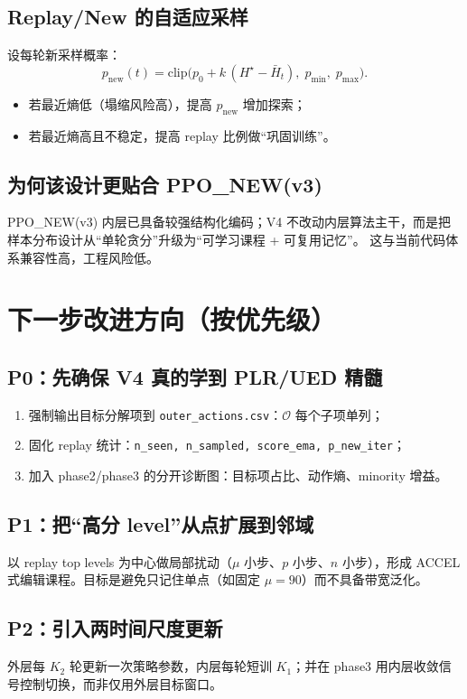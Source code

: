 \documentclass[UTF8,11pt,a4paper]{ctexart}
\begin{document}
\subsection{Replay/New 的自适应采样}
设每轮新采样概率：
\begin{equation}
\label{eq:pnew}
p_{\mathrm{new}}(t)=\mathrm{clip}\Big(p_0+k\,(H^\star-\bar H_t),\;p_{\min},\;p_{\max}\Big).
\end{equation}
\begin{itemize}
\item 若最近熵低（塌缩风险高），提高 $p_{\mathrm{new}}$ 增加探索；
\item 若最近熵高且不稳定，提高 replay 比例做“巩固训练”。
\end{itemize}

\subsection{为何该设计更贴合 PPO\_NEW(v3)}
PPO\_NEW(v3) 内层已具备较强结构化编码；V4 不改动内层算法主干，而是把样本分布设计从“单轮贪分”升级为“可学习课程 + 可复用记忆”。
这与当前代码体系兼容性高，工程风险低。

\section{下一步改进方向（按优先级）}
\subsection*{P0：先确保 V4 真的学到 PLR/UED 精髓}
\begin{enumerate}
\item 强制输出目标分解项到 \texttt{outer\_actions.csv}：$\mathcal O$ 每个子项单列；
\item 固化 replay 统计：\texttt{n\_seen, n\_sampled, score\_ema, p\_new\_iter}；
\item 加入 phase2/phase3 的分开诊断图：目标项占比、动作熵、minority 增益。
\end{enumerate}

\subsection*{P1：把“高分 level”从点扩展到邻域}
以 replay top levels 为中心做局部扰动（\(\mu\) 小步、\(p\) 小步、\(n\) 小步），形成 ACCEL 式编辑课程。目标是避免只记住单点（如固定 \(\mu=90\)）而不具备带宽泛化。

\subsection*{P2：引入两时间尺度更新}
外层每 $K_2$ 轮更新一次策略参数，内层每轮短训 $K_1$；并在 phase3 用内层收敛信号控制切换，而非仅用外层目标窗口。
\end{document}
